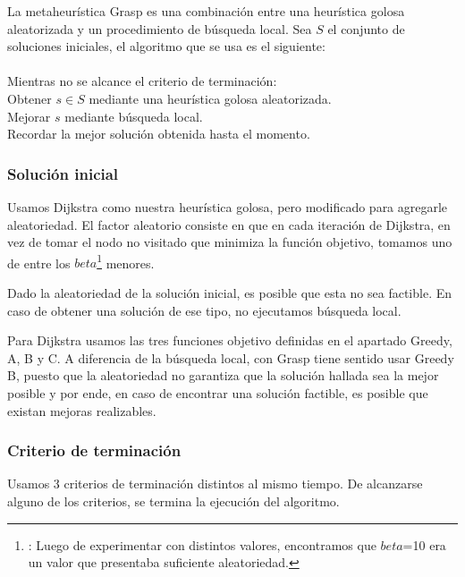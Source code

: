 La metaheurística Grasp es una combinación entre una heurística golosa aleatorizada y un procedimiento de búsqueda local.
Sea $S$ el conjunto de soluciones iniciales, el algoritmo que se usa es el siguiente:\\\\
\hspace*{1 cm} Mientras no se alcance el criterio de terminación:\\
\hspace*{2 cm} Obtener $s \in S$ mediante una heurística golosa aleatorizada.\\
\hspace*{2 cm} Mejorar $s$ mediante búsqueda local.\\
\hspace*{2 cm} Recordar la mejor solución obtenida hasta el momento.\\
\subsubsection{Solución inicial}

Usamos Dijkstra como nuestra heurística golosa, pero modificado para agregarle aleatoriedad. El factor aleatorio consiste en que en cada iteración de Dijkstra, en vez de tomar el nodo no visitado que minimiza la función objetivo, tomamos uno de entre los $beta$\footnote{\label{$beta$}: Luego de experimentar con distintos valores, encontramos que $beta$=10 era un valor que presentaba suficiente aleatoriedad.} menores.

Dado la aleatoriedad de la solución inicial, es posible que esta no sea factible. En caso de obtener una solución de ese tipo, no ejecutamos búsqueda local.

Para Dijkstra usamos las tres funciones objetivo definidas en el apartado Greedy, A, B y C. A diferencia de la búsqueda local, con Grasp tiene sentido usar Greedy B, puesto que la aleatoriedad no garantiza que la solución hallada sea la mejor posible y por ende, en caso de encontrar una solución factible, es posible que existan mejoras realizables.

\subsubsection{Criterio de terminación}

Usamos 3 criterios de terminación distintos al mismo tiempo. De alcanzarse alguno de los criterios, se termina la ejecución del algoritmo.

